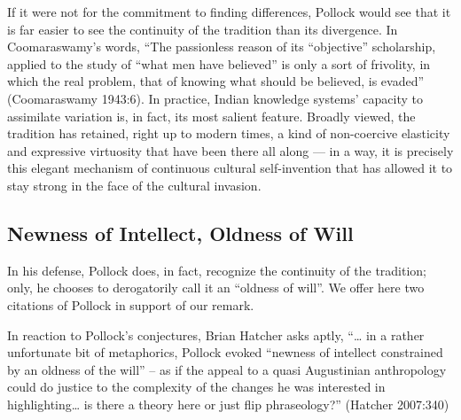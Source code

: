 If it were not for the commitment to finding differences, Pollock would see that it is far easier to see the continuity of the tradition than its divergence. In Coomaraswamy’s words, “The passionless reason of its “objective” scholarship, applied to the study of “what men have believed” is only a sort of frivolity, in which the real problem, that of knowing what should be believed, is evaded” (Coomaraswamy 1943:6). In practice, Indian knowledge systems’ capacity to assimilate variation is, in fact, its most salient feature. Broadly viewed, the tradition has retained, right up to modern times, a kind of non-coercive elasticity and expressive virtuosity that have been there all along — in a way, it is precisely this elegant mechanism of continuous cultural self-invention that has allowed it to stay strong in the face of the cultural invasion.\\[-20pt] 


\subsection{Newness of Intellect, Oldness of Will}%

In his defense, Pollock does, in fact, recognize the continuity of the tradition; only, he chooses to derogatorily call it an “oldness of will”. We offer here two citations of Pollock in support of our remark.
In reaction to Pollock’s conjectures, Brian Hatcher asks aptly, “… in a rather unfortunate bit of metaphorics, Pollock evoked “newness of intellect constrained by an oldness of the will” – as if the appeal to a quasi Augustinian anthropology could do justice to the complexity of the changes he was interested in highlighting… is there a theory here or just flip phraseology?” (Hatcher 2007:340) 

